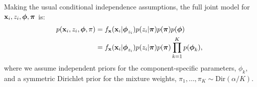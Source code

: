 \documentclass[12pt]{article}
\begin{document}
Making the usual conditional independence assumptions, the full joint model for ${\bf x}_i, z_i, \boldsymbol{\phi}, \boldsymbol{\pi}$ is:
\begin{align}
p({\bf x}_i,z_i, \boldsymbol{\phi}, \pi) &= f_{\bf x}({\bf x}_i | \boldsymbol{\phi}_{z_i})p(z_i | \boldsymbol{\pi})p(\boldsymbol{\pi})p(\boldsymbol{\phi})\\
&= f_{\bf x}({\bf x}_i | \boldsymbol{\phi}_{z_i})p(z_i | \boldsymbol{\pi})p(\boldsymbol{\pi})\prod_{k = 1}^K p(\boldsymbol{\phi}_k),
\end{align}
where we assume independent priors for the component-specific parameters, $\phi_k$, and a symmetric Dirichlet prior for the mixture weights, $\pi_1, \ldots, \pi_K \sim \mbox{Dir}(\alpha/K)$.

%
%
%
%
%
\end{document}
